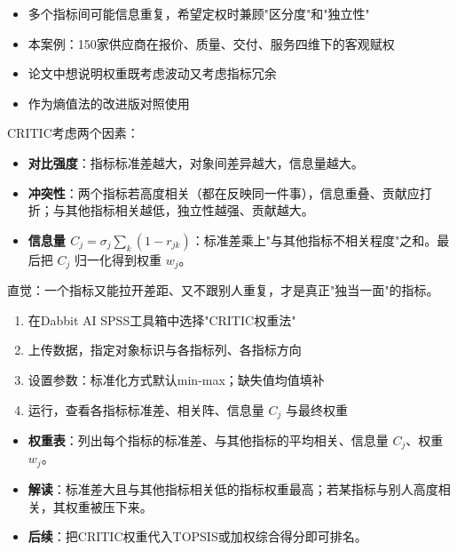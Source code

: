 \begin{algoscene}
\begin{itemize}
    \item 多个指标间可能信息重复，希望定权时兼顾"区分度"和"独立性"
    \item 本案例：150家供应商在报价、质量、交付、服务四维下的客观赋权
    \item 论文中想说明权重既考虑波动又考虑指标冗余
    \item 作为熵值法的改进版对照使用
\end{itemize}
\end{algoscene}

\begin{algoprinciple}
CRITIC考虑两个因素：

\begin{itemize}
    \item \textbf{对比强度}：指标标准差越大，对象间差异越大，信息量越大。
    \item \textbf{冲突性}：两个指标若高度相关（都在反映同一件事），信息重叠、贡献应打折；与其他指标相关越低，独立性越强、贡献越大。
    \item \textbf{信息量 $C_j$}$=\sigma_j\sum_k(1-r_{jk})$：标准差乘上"与其他指标不相关程度"之和。最后把 $C_j$ 归一化得到权重 $w_j$。
\end{itemize}

直觉：一个指标又能拉开差距、又不跟别人重复，才是真正"独当一面"的指标。
\end{algoprinciple}

\begin{algosposs}
\begin{enumerate}
    \item 在Dabbit AI SPSS工具箱中选择"CRITIC权重法"
    \item 上传数据，指定对象标识与各指标列、各指标方向
    \item 设置参数：标准化方式默认min-max；缺失值均值填补
    \item 运行，查看各指标标准差、相关阵、信息量 $C_j$ 与最终权重
\end{enumerate}
\end{algosposs}

\begin{algoresult}
\begin{itemize}
    \item \textbf{权重表}：列出每个指标的标准差、与其他指标的平均相关、信息量 $C_j$、权重 $w_j$。
    \item \textbf{解读}：标准差大且与其他指标相关低的指标权重最高；若某指标与别人高度相关，其权重被压下来。
    \item \textbf{后续}：把CRITIC权重代入TOPSIS或加权综合得分即可排名。
\end{itemize}
\end{algoresult}

